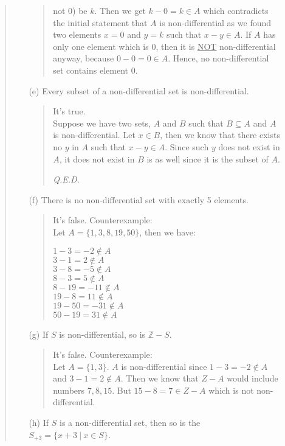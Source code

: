 \documentclass[12pt, a4paper]{article}                      %
\begin{document}
\begin{enumerate}
\begin{quote}
\begin{itemize}
\begin{quote}
not 0) be $k$. Then we get $k - 0 = k \in A$ which contradicts the initial statement that
$A$ is non-differential as we found two elements $x = 0$ and $y = k$ such that $x - y \in A$.
If $A$ has only one element which is $0$, then it is \underline{NOT} non-differential anyway,
because $0 - 0 = 0 \in A$. Hence, no non-differential set contains element 0.
\end{quote}
\item[(e)]
Every subset of a non-differential set is non-differential.
\begin{quote}
It's true.\\
Suppose we have two sets, $A$ and $B$ such that $B \subseteq A$ and $A$ is non-differential.
Let $x \in B$, then we know that there exists no $y$ in $A$ such that $x - y \in A$.
Since such $y$ does not exist in $A$, it does not exist in $B$ is as well since it is the subset
of $A$.
\begin{flushright}
\textit{Q.E.D.}
\end{flushright}
\end{quote}
\item[(f)]
There is no non-differential set with exactly 5 elements.
\begin{quote}
It's false. Counterexample:\\
Let $A = \{1, 3, 8, 19, 50\}$, then we have:
\begin{center}
$1 - 3 = -2 \notin A$\\
$3 - 1 = 2 \notin A$\\
$3 - 8 = -5 \notin A$\\
$8 - 3 = 5 \notin A$\\
$8 - 19 = -11 \notin A$\\
$19 - 8 = 11 \notin A$\\
$19 - 50 = -31 \notin A$\\
$50 - 19 = 31 \notin A$\\
\end{center}
\end{quote}
\item[(g)]
If $S$ is non-differential, so is $\mathbb{Z} - S$.
\begin{quote}
It's false. Counterexample:\\
Let $A = \{1, 3\}$. $A$ is non-differential since $1 - 3 = -2 \notin A$ and $3 - 1 = 2 \notin A$.
Then we know that $Z - A$ would include numbers $7,8,15$. But $15 - 8 = 7 \in Z - A$ which is not
non-differential.
\end{quote}
\item[(h)]
If $S$ is a non-differential set, then so is the $S_{+3} = \{x + 3 \ | \ x \in S\}$.

\end{itemize}
\end{quote}
\end{enumerate}
\end{document}
